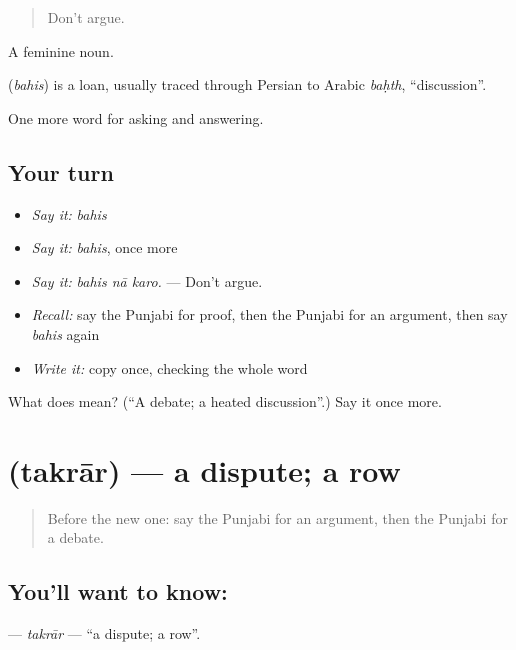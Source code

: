 \begin{quote}
Don't argue.
\end{quote}

A feminine noun.

\begin{cousinweb}
\textbf{} (\emph{bahis}) is a loan, usually traced through Persian to Arabic \emph{baḥth}, \textquotedblleft{}discussion\textquotedblright{}.
\end{cousinweb}

\begin{grammarlens}[title={What you've built}]
One more word for asking and answering.
\end{grammarlens}

\subsection*{Your turn}
\begin{itemize}
\raggedright
  \item \emph{Say it:} \emph{bahis}
  \item \emph{Say it:} \emph{bahis}, once more
  \item \emph{Say it:} \emph{bahis nā karo.} — Don't argue.
  \item \emph{Recall:} say the Punjabi for proof, then the Punjabi for an argument, then say \emph{bahis} again
  \item \emph{Write it:} copy \textbf{} once, checking the whole word
\end{itemize}

\begin{tcolorbox}[breakable,colback=teal!4,colframe=teal!35!black,title={Before you move on}]
What does  mean? (\textquotedblleft{}A debate; a heated discussion\textquotedblright{}.) Say it once more.
\end{tcolorbox}
\section[\texorpdfstring{\pa{ਤਕਰਾਰ} (takrār)}{ਤਕਰਾਰ (takrār)}]{ (takrār) — a dispute; a row}

\label{lesson:PA-C344-takrar}



\begin{quote}
Before the new one: say the Punjabi for an argument, then the Punjabi for a debate.
\end{quote}

\subsection*{You'll want to know: }
\textbf{} — \emph{takrār} — \textquotedblleft{}a dispute; a row\textquotedblright{}.


